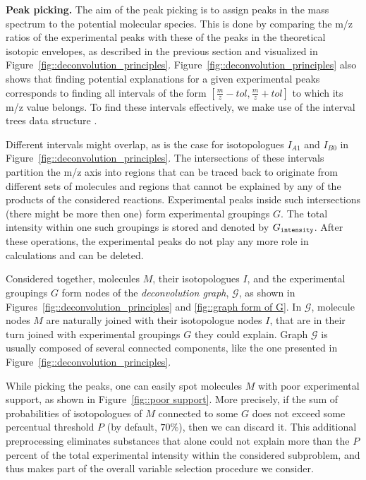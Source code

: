 \documentclass[journal=ancham, manuscript=article, layout=twocolumn]{achemso}
\begin{document}
\noindent\textbf{Peak picking.}
The aim of the peak picking is to assign peaks in the mass spectrum to the potential molecular species. 
This is done by comparing the m/z ratios of the experimental peaks with these of the peaks in the theoretical isotopic envelopes, as described in the previous section and visualized in Figure~\ref{fig::deconvolution_principles}. 
Figure~\ref{fig::deconvolution_principles} also shows that finding potential explanations for a given experimental peaks corresponds to finding all intervals of the form $[\frac{m}{z} - tol, \frac{m}{z} + tol]$ to which its m/z value belongs. 
To find these intervals effectively, we make use of the interval trees data structure \citep{cormen2009leiserson}.

Different intervals might overlap, as is the case for isotopologues $I_{A1}$ and $I_{B0}$ in Figure~\ref{fig::deconvolution_principles}.
The intersections of these intervals partition the m/z axis into regions that can be traced back to originate from different sets of molecules and regions that cannot be explained by any of the products of the considered reactions. 
Experimental peaks inside such intersections (there might be more then one) form experimental groupings $G$.
The total intensity within one such groupings is stored and denoted by $G_\text{\tt intensity}$. 
After these operations, the experimental peaks do not play any more role in calculations and can be deleted.

Considered together, molecules $M$, their isotopologues $I$, and the experimental groupings $G$ form nodes of the \textit{deconvolution graph}, $\mathcal{G}$, as shown in Figures~\ref{fig::deconvolution_principles} and \ref{fig::graph form of G}.
In $\mathcal{G}$, molecule nodes $M$ are naturally joined with their isotopologue nodes $I$, that are in their turn joined with experimental groupings $G$ they could explain.
Graph $\mathcal{G}$ is usually composed of several connected components, like the one presented in Figure~\ref{fig::deconvolution_principles}.

While picking the peaks, one can easily spot molecules $M$ with poor experimental support, as shown in Figure~\ref{fig::poor support}.
More precisely, if the sum of probabilities of isotopologues of $M$ connected to some $G$ does not exceed some percentual threshold $P$ (by default, $70\%$), then we can discard it.  
This additional preprocessing eliminates substances that alone could not explain more than the $P$ percent of the total experimental intensity within the considered subproblem, and thus makes part of the overall variable selection procedure we consider.
\end{document}
